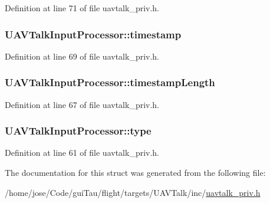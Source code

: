 Definition at line 71 of file uavtalk\-\_\-priv.\-h.

\hypertarget{struct_u_a_v_talk_input_processor_a184962821e9c4b260b39f7bf1c576150}{
\subsubsection[{timestamp}]{ U\-A\-V\-Talk\-Input\-Processor\-::timestamp}}\label{struct_u_a_v_talk_input_processor_a184962821e9c4b260b39f7bf1c576150}


Definition at line 69 of file uavtalk\-\_\-priv.\-h.

\hypertarget{struct_u_a_v_talk_input_processor_ae5fadf5b763839a191f044b2a2492366}{
\subsubsection[{timestamp\-Length}]{ U\-A\-V\-Talk\-Input\-Processor\-::timestamp\-Length}}\label{struct_u_a_v_talk_input_processor_ae5fadf5b763839a191f044b2a2492366}


Definition at line 67 of file uavtalk\-\_\-priv.\-h.

\hypertarget{struct_u_a_v_talk_input_processor_a65de259b3813b2be47d056480622bcbc}{
\subsubsection[{type}]{ U\-A\-V\-Talk\-Input\-Processor\-::type}}\label{struct_u_a_v_talk_input_processor_a65de259b3813b2be47d056480622bcbc}


Definition at line 61 of file uavtalk\-\_\-priv.\-h.



The documentation for this struct was generated from the following file\-:\begin{DoxyCompactItemize}
\item 
/home/jose/\-Code/gui\-Tau/flight/targets/\-U\-A\-V\-Talk/inc/\hyperlink{uavtalk__priv_8h}{uavtalk\-\_\-priv.\-h}\end{DoxyCompactItemize}
